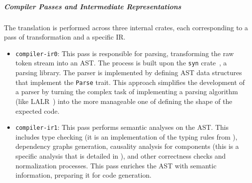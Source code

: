 \subparagraph{Compiler Passes and Intermediate Representations}
The translation is performed across three internal crates, each corresponding to a pass of
transformation and a specific IR.
\begin{itemize}
    \item \texttt{compiler-ir0}: This pass is responsible for parsing, transforming the raw token
          stream into an AST. The process is built upon the \texttt{syn} crate~\cite{syn_rust}, a
          parsing library. The parser is implemented by defining AST data structures that implement
          the \texttt{Parse} trait. This approach simplifies the development of a parser
          by turning the complex task of implementing a parsing algorithm (like
          LALR~\cite{DBLP:journals/toplas/DeRemerP82}) into the more manageable one of defining the shape of the
          expected code.

    \item \texttt{compiler-ir1}: This pass performs semantic analyses on the AST. This includes type
          checking (it is an implementation of the typing rules from ),
          dependency graphs generation, causality analysis for components (this is a specific
          analysis that is detailed in ), and other correctness
          checks and normalization processes. This pass enriches the AST with semantic information,
          preparing it for code generation.


\end{itemize}
